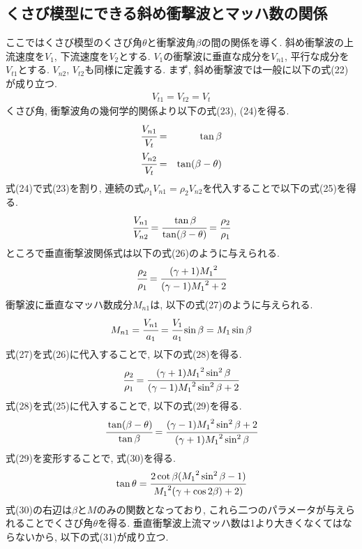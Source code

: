 \documentclass[12pt]{jsarticle}
\begin{document}
\subsection{くさび模型にできる斜め衝撃波とマッハ数の関係}
ここではくさび模型のくさび角$\theta$と衝撃波角$\beta$の間の関係を導く. 斜め衝撃波の上流速度を$V_1$, 下流速度を$V_2$とする. $V_1$の衝撃波に垂直な成分を$V_{n1}$, 平行な成分を$V_{t1}$とする. $V_{n2}$, $V_{t2}$も同様に定義する. まず, 斜め衝撃波では一般に以下の式(22)が成り立つ.
\begin{eqnarray}
V_{t1} = V_{t2} = V_t
\end{eqnarray}
くさび角, 衝撃波角の幾何学的関係より以下の式(23), (24)を得る.
\begin{eqnarray}
\cfrac{V_{n1}}{V_t} &=& \tan{\beta} \\
\cfrac{V_{n2}}{V_t} &=& \tan(\beta-\theta)
\end{eqnarray}
式(24)で式(23)を割り, 連続の式$\rho_1 V_{n1}=\rho_2 V_{n2}$を代入することで以下の式(25)を得る.
\begin{eqnarray}
\cfrac{V_{n1}}{V_{n2}} = \cfrac{\tan{\beta}}{\tan(\beta-\theta)} = \cfrac{\rho_2}{\rho_1}
\end{eqnarray}
ところで垂直衝撃波関係式は以下の式(26)のように与えられる.
\begin{eqnarray}
\cfrac{\rho_2}{\rho_1} = \cfrac{(\gamma+1){M_1}^2}{(\gamma-1){M_1}^2+2}
\end{eqnarray}
衝撃波に垂直なマッハ数成分$M_{n1}$は, 以下の式(27)のように与えられる.
\begin{eqnarray}
M_{n1} = \cfrac{V_{n1}}{a_1} = \cfrac{V_1}{a_1}\sin\beta = M_1 \sin\beta
\end{eqnarray}
式(27)を式(26)に代入することで, 以下の式(28)を得る.
\begin{eqnarray}
\cfrac{\rho_2}{\rho_1} = \cfrac{(\gamma+1){M_1}^2\sin^2\beta}{(\gamma-1){M_1}^2\sin^2\beta+2}
\end{eqnarray}
式(28)を式(25)に代入することで, 以下の式(29)を得る.
\begin{eqnarray}
\cfrac{\tan(\beta-\theta)}{\tan\beta} = \cfrac{(\gamma-1){M_1}^2\sin^2\beta+2}{(\gamma+1){M_1}^2\sin^2\beta}
\end{eqnarray}
式(29)を変形することで, 式(30)を得る.
\begin{eqnarray}
\tan\theta = \cfrac{2\cot\beta({M_1}^2\sin^2\beta-1)}{{M_1}^2(\gamma+\cos2\beta)+2)}
\end{eqnarray}
式(30)の右辺は$\beta$と$M$のみの関数となっており, これら二つのパラメータが与えられることでくさび角$\theta$を得る. 垂直衝撃波上流マッハ数は1より大きくなくてはならないから, 以下の式(31)が成り立つ.
\end{document}
